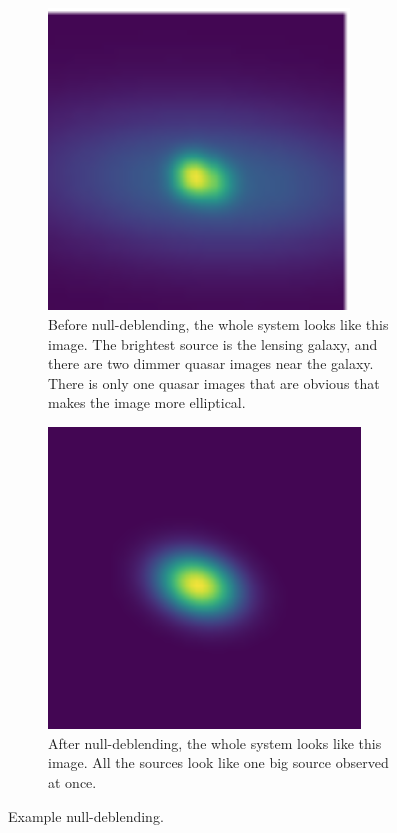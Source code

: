 \documentclass[\docopts]{\docclass}
\begin{document}
\begin{figure}
    \centering
    \begin{subfigure}[bt]{0.48\linewidth}        %
        \centering
        \includegraphics[width=\linewidth, height=8cm]{beforenulldeblend.png}
        \caption{Before null-deblending, the whole system looks like this image. The brightest source is the lensing galaxy, and there are two dimmer quasar images near the galaxy. There is only one quasar images that are obvious that makes the image more elliptical.}
    \end{subfigure}
    \begin{subfigure}[bt]{0.48\linewidth}        %
        \centering
        \includegraphics[width=\linewidth, height=8cm]{afternulldeblend.png}
        \caption{After null-deblending, the whole system looks like this image. All the sources look like one big source observed at once.                                                                                                                                                                                 }
    \end{subfigure}
    \caption{Example null-deblending.}
    \label{fig:null-deblend}
\end{figure}
\end{document}
